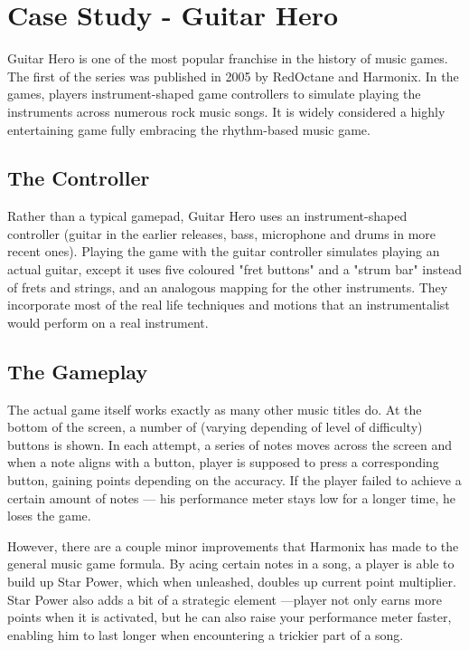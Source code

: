   \vspace{40pt}

\section{Case Study - Guitar Hero}

Guitar Hero is one of the most popular franchise in the history of music games. The first of the series was published in 2005 by RedOctane and Harmonix. In the games, players instrument-shaped game controllers to simulate playing the instruments across numerous rock music songs. It is widely considered a highly entertaining game fully embracing the rhythm-based music game.


\subsection{The Controller}


Rather than a typical gamepad, Guitar Hero uses an instrument-shaped controller (guitar in the earlier releases, bass, microphone and drums in more recent ones). Playing the game with the guitar controller simulates playing an actual guitar, except it uses five coloured "fret buttons" and a "strum bar" instead of frets and strings, and an analogous mapping for the other instruments. They incorporate most of the real life techniques and motions that an instrumentalist would perform on a real instrument.


\subsection{The Gameplay}

The actual game itself works exactly as many other music titles do. At the bottom of the screen, a number of (varying depending of level of difficulty) buttons is shown. In each attempt, a series of notes moves across the screen and when a note aligns with a button, player is supposed to press a corresponding button, gaining points depending on the accuracy. If the player failed to achieve a certain amount of notes — his performance meter stays low for a longer time, he loses the game.

However, there are a couple minor improvements that Harmonix has made to the general music game formula. By acing certain notes in a song, a player is able to build up Star Power, which when unleashed, doubles up current point multiplier. Star Power also adds a bit of a strategic element —player not only earns more points when it is activated, but he can also raise your performance meter faster, enabling him to last longer when encountering a trickier part of a song.


